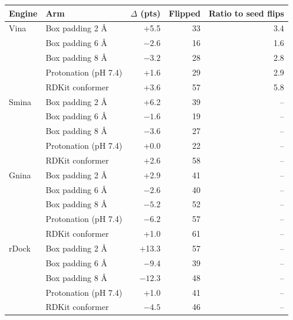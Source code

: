 \begin{tabular}{llrrr}
\toprule
Engine & Arm & $\Delta$ (pts) & Flipped & Ratio to seed flips \\
\midrule
Vina & Box padding 2 \AA{} & +5.5 & 33 & 3.4 \\
 & Box padding 6 \AA{} & $-2.6$ & 16 & 1.6 \\
 & Box padding 8 \AA{} & $-3.2$ & 28 & 2.8 \\
 & Protonation (pH 7.4) & +1.6 & 29 & 2.9 \\
 & RDKit conformer & +3.6 & 57 & 5.8 \\
\addlinespace
Smina & Box padding 2 \AA{} & +6.2 & 39 & -- \\
 & Box padding 6 \AA{} & $-1.6$ & 19 & -- \\
 & Box padding 8 \AA{} & $-3.6$ & 27 & -- \\
 & Protonation (pH 7.4) & +0.0 & 22 & -- \\
 & RDKit conformer & +2.6 & 58 & -- \\
\addlinespace
Gnina & Box padding 2 \AA{} & +2.9 & 41 & -- \\
 & Box padding 6 \AA{} & $-2.6$ & 40 & -- \\
 & Box padding 8 \AA{} & $-5.2$ & 52 & -- \\
 & Protonation (pH 7.4) & $-6.2$ & 57 & -- \\
 & RDKit conformer & +1.0 & 61 & -- \\
\addlinespace
rDock & Box padding 2 \AA{} & +13.3 & 57 & -- \\
 & Box padding 6 \AA{} & $-9.4$ & 39 & -- \\
 & Box padding 8 \AA{} & $-12.3$ & 48 & -- \\
 & Protonation (pH 7.4) & +1.0 & 41 & -- \\
 & RDKit conformer & $-4.5$ & 46 & -- \\
\bottomrule
\end{tabular}
